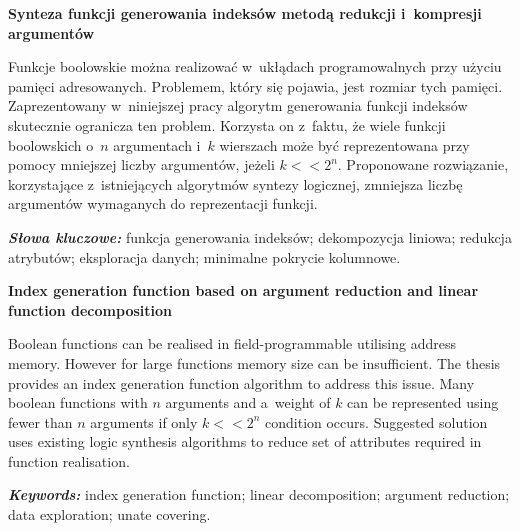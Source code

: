 \newpage
\vspace{10cm}

\newpage
\begin{center}
	\textbf{Synteza funkcji generowania indeksów metodą redukcji i~kompresji argumentów}
\end{center}

Funkcje boolowskie można realizować w~ukłądach programowalnych przy użyciu pamięci adresowanych.
Problemem, który się pojawia, jest rozmiar tych pamięci.
Zaprezentowany w~niniejszej pracy algorytm generowania funkcji indeksów skutecznie ogranicza ten problem.
Korzysta on z~faktu,
że wiele funkcji boolowskich o~$n$ argumentach i~$k$ wierszach może być reprezentowana przy pomocy mniejszej liczby argumentów,
jeżeli $k<<2^n$.
Proponowane rozwiązanie,
korzystające z~istniejących algorytmów syntezy logicznej,
zmniejsza liczbę argumentów wymaganych do reprezentacji funkcji.

\textit{\textbf{Słowa kluczowe:}} funkcja generowania indeksów; dekompozycja liniowa; redukcja atrybutów; eksploracja danych; minimalne pokrycie kolumnowe.

	\vspace{1cm}

\begin{center}
    \textbf{Index generation function based on argument reduction and linear function decomposition}
\end{center}

Boolean functions can be realised in field-programmable utilising address memory.
However for large functions memory size can be insufficient.
The thesis provides an index generation function algorithm to address this issue.
Many boolean functions with $n$ arguments and a~weight of $k$ can be represented using fewer than $n$ arguments if only $k<<2^n$ condition occurs.
Suggested solution uses existing logic synthesis algorithms to reduce set of attributes required in function realisation.

\textit{\textbf{Keywords:}} index generation function; linear decomposition; argument reduction; data exploration; unate covering.

